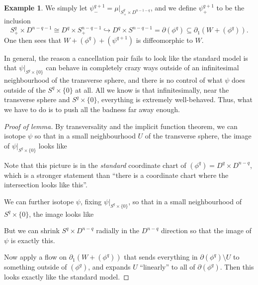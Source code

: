 \documentclass[a4paper, 12pt]{article}
\theoremstyle{definition}
\newtheorem{eg}[thm]{Example}
\begin{document}
\begin{eg}
  We simply let $\psi^{q + 1}_- = \mu|_{S^q_+ \times D^{n - 1 - q}}$, and we define $\psi_+^{q + 1}$ to be the inclusion
  \[
    S^q_+ \times D^{n - q - 1} \cong D^q \times S_+^{n - q - 1} \hookrightarrow D^q \times S^{n - q - 1} = \partial (\phi^q) \subseteq \partial_1(W + (\phi^q)).
  \]
  One then sees that $W + (\phi^q) + (\psi^{q + 1})$ is diffeomorphic to $W$.
\end{eg}

In general, the reason a cancellation pair fails to look like the standard model is that $\psi|_{S^q \times \{0\}}$ can behave in completely crazy ways outside of an infinitesimal neighbourhood of the transverse sphere, and there is no control of what $\psi$ does outside of the $S^q \times \{0\}$ at all. All we know is that infinitesimally, near the transverse sphere and $S^q \times \{0\}$, everything is extremely well-behaved. Thus, what we have to do is to push all the badness far away enough.

\begin{proof}[Proof of lemma]
  By transversality and the implicit function theorem, we can isotope $\psi$ so that in a small neighbourhood $U$ of the transverse sphere, the image of $\psi|_{S^q \times \{0\}}$ looks like
  \begin{center}
  \end{center}
  Note that this picture is in the \emph{standard} coordinate chart of $(\phi^q) = D^q \times D^{n - q}$, which is a stronger statement than ``there is a coordinate chart where the intersection looks like this''.

  We can further isotope $\psi$, fixing $\psi|_{S^q \times \{0\}}$, so that in a small neighbourhood of $S^q \times \{0\}$, the image looks like
  \begin{center}
  \end{center}
  But we can shrink $S^q \times D^{n - q}$ radially in the $D^{n - q}$ direction so that the image of $\psi$ is exactly this.

  Now apply a flow on $\partial_1 (W + (\phi^q))$ that sends everything in $\partial (\phi^q) \setminus U$ to something outside of $(\phi^q)$, and expands $U$ ``linearly'' to all of $\partial (\phi^q)$. Then this looks exactly like the standard model.
\end{proof}
\end{document}
